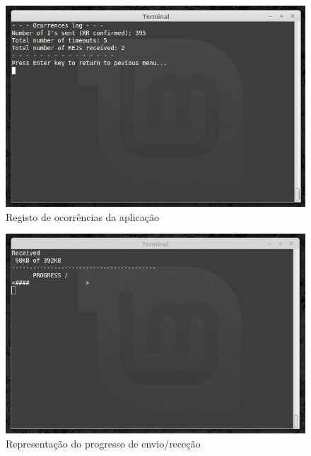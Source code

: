 \documentclass[11pt,a4paper,reqno]{report}
\numberwithin{equation}{section}
\begin{document}
\begin{appendices}
\begin{figure}[h]
	\centering
	\includegraphics[width=12cm]{log.png}
	\caption{Registo de ocorrências da aplicação}
	\label{logimg}
\end{figure}

\begin{figure}[h]
	\centering
	\includegraphics[width=12cm]{progress.png}
	\caption{Representação do progresso de envio/receção}
	\label{progressimg}
\end{figure}


\end{appendices}
\end{document}
